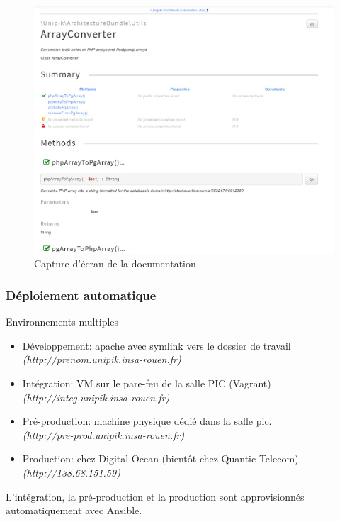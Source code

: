 \begin{frame}
      \begin{figure}[r]
		\includegraphics[scale=0.2]{images/doc.png}
		\caption{Capture d'écran de la documentation}
	  \end{figure}
\end{frame}

\begin{frame}
\frametitle{Déploiement automatique}
\begin{block}{Environnements multiples}
	\begin{itemize}
		\item Développement: apache avec symlink vers le dossier de travail \\
		\emph{\tiny(http://prenom.unipik.insa-rouen.fr)}
		\item Intégration: VM sur le pare-feu de la salle PIC (Vagrant) \\
		\emph{\tiny(http://integ.unipik.insa-rouen.fr)}
		\item Pré-production: machine physique dédié dans la salle pic. \\
		\emph{\tiny(http://pre-prod.unipik.insa-rouen.fr)}
		\item Production: chez Digital Ocean (bientôt chez Quantic Telecom) \\
		\emph{\tiny(http://138.68.151.59)}
	\end{itemize}
\end{block}

L'intégration, la pré-production et la production sont approvisionnés automatiquement avec Ansible.

\end{frame}
